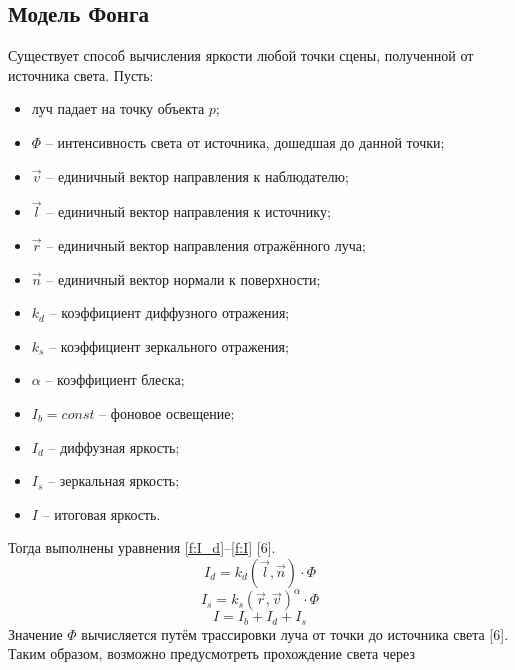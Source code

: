 {    \subsection {Модель Фонга} {
        Существует способ вычисления яркости любой точки сцены,
        полученной от источника света.
        Пусть:
        \begin{itemize}
            \item луч падает на точку объекта $p$;
            \item
                $\Phi$ -- интенсивность света от источника,
                дошедшая до данной точки;
            \item $\vec{v}$ -- единичный вектор направления к наблюдателю;
            \item $\vec{l}$ -- единичный вектор направления к источнику;
            \item $\vec{r}$ -- единичный вектор направления отражённого луча;
            \item $\vec{n}$ -- единичный вектор нормали к поверхности;
            \item $k_d$ -- коэффициент диффузного отражения;
            \item $k_s$ -- коэффициент зеркального отражения;
            \item $\alpha$ -- коэффициент блеска;
            \item $I_b = const$ -- фоновое освещение;
            \item $I_d$ -- диффузная яркость;
            \item $I_s$ -- зеркальная яркость;
            \item $I$ -- итоговая яркость.
        \end{itemize}
        Тогда выполнены уравнения \ref{f:I_d}--\ref{f:I} [6].
        \begin{equation}
            \label{f:I_d}
            I_d = k_d(\vec{l}, \vec{n}) \cdot \Phi
        \end{equation}
        \begin{equation}
            \label{f:I_s}
            I_s = k_s(\vec{r}, \vec{v})^{\alpha} \cdot \Phi
        \end{equation}
        \begin{equation}
            \label{f:I}
            I = I_b + I_d + I_s
        \end{equation}
        Значение $\Phi$ вычисляется путём трассировки луча
        от точки до источника света [6].
        Таким образом, возможно предусмотреть прохождение света через
}}
